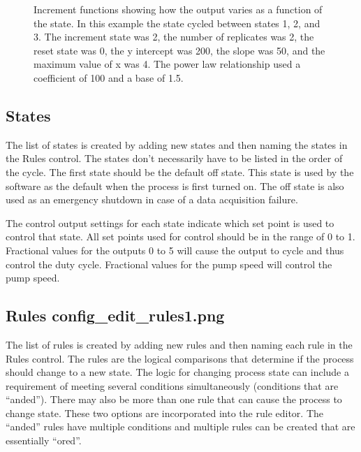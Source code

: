 \documentclass[letterpaper,10pt,english]{sphinxmanual}
\let\sphinxpxdimen\pdfpxdimen\else\newdimen\sphinxpxdimen
\begin{document}
\begin{figure}[htbp]
\centering
\capstart

\noindent\sphinxincludegraphics[width=600\sphinxpxdimen]{{increment_functions}.png}
\caption{Increment functions showing how the output varies as a function of the state. In this example the state cycled between states 1, 2, and 3. The increment state was 2, the number of replicates was 2, the reset state was 0, the y intercept was 200, the slope was 50, and the maximum value of x was 4. The power law relationship used a coefficient of 100 and a base of 1.5.}\label{\detokenize{ProCoDA/ProCoDA:id8}}\label{\detokenize{ProCoDA/ProCoDA:figure-increment-functions}}\end{figure}


\subsection{States}
\label{\detokenize{ProCoDA/ProCoDA:states}}\label{\detokenize{ProCoDA/ProCoDA:heading-procoda-states}}
The list of states is created by adding new states and then naming the states in the Rules control. The states don’t necessarily have to be listed in the order of the cycle. The first state should be the default off state. This state is used by the software as the default when the process is first turned on. The off state is also used as an emergency shutdown in case of a data acquisition failure.

The control output settings for each state indicate which set point is used to control that state. All set points used for control should be in the range of 0 to 1. Fractional values for the outputs 0 to 5 will cause the output to cycle and thus control the duty cycle. Fractional values for the pump speed will control the pump speed.


\subsection[Rules]{Rules \lowercase{\sphinxincludegraphics}{{config_edit_rules1}.png}}
\label{\detokenize{ProCoDA/ProCoDA:rules-config-edit-rules}}\label{\detokenize{ProCoDA/ProCoDA:heading-procoda-rules}}
The list of rules is created by adding new rules and then naming each rule in the Rules control. The rules are the logical comparisons that determine if the process should change to a new state. The logic for changing process state can include a requirement of meeting several conditions simultaneously (conditions that are “anded”). There may also be more than one rule that can cause the process to change state. These two options are incorporated into the rule editor. The “anded” rules have multiple conditions and multiple rules can be created that are essentially “ored”.
\end{document}
